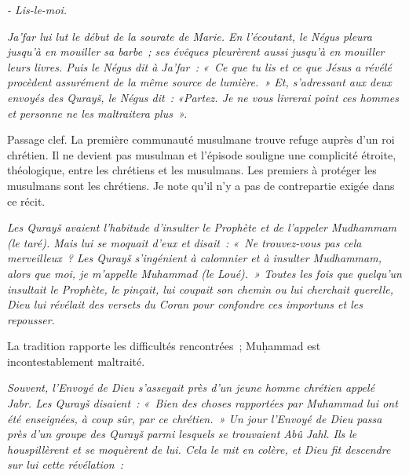 \emph{- Lis-le-moi.}

\emph{Ja'far lui lut le début de la sourate de Marie. En l'écoutant, le
Négus pleura jusqu'à en mouiller sa barbe~; ses évêques pleurèrent aussi
jusqu'à en mouiller leurs livres. Puis le Négus dit à Ja'far~: «~Ce que
tu lis et ce que Jésus a révélé procèdent assurément de la même source
de lumière.~» Et, s'adressant aux deux envoyés des Qurayš, le Négus
dit~: «Partez. Je ne vous livrerai point ces hommes et personne ne les
maltraitera plus~».}

Passage clef. La première communauté musulmane trouve refuge auprès d'un
roi chrétien. Il ne devient pas musulman et l'épisode souligne une
complicité étroite, théologique, entre les chrétiens et les musulmans.
Les premiers à protéger les musulmans sont les chrétiens. Je note qu'il
n'y a pas de contrepartie exigée dans ce récit.


\emph{Les Qurayš avaient l'habitude d'insulter le Prophète et de
l'appeler Mudhammam (le taré). Mais lui se moquait d'eux et disait~:
«~Ne trouvez-vous pas cela merveilleux~? Les Qurayš s'ingénient à
calomnier et à insulter Mudhammam, alors que moi, je m'appelle Muhammad
(le Loué).~» Toutes les fois que quelqu'un insultait le Prophète, le
pinçait, lui coupait son chemin ou lui cherchait querelle, Dieu lui
révélait des versets du Coran pour confondre ces importuns et les
repousser.}

La tradition rapporte les difficultés rencontrées~; Muḥammad est
incontestablement maltraité.


\emph{Souvent, l'Envoyé de Dieu s'asseyait près d'un jeune homme
chrétien appelé Jabr. Les Qurayš disaient~: «~Bien des choses rapportées
par Muhammad lui ont été enseignées, à coup sûr, par ce chrétien.~» Un
jour l'Envoyé de Dieu passa près d'un groupe des Qurayš parmi lesquels
se trouvaient Abû Jahl. Ils le houspillèrent et se moquèrent de lui.
Cela le mit en colère, et Dieu fit descendre sur lui cette révélation~:}


